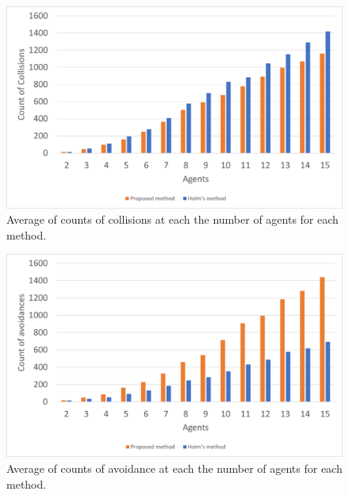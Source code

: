 \begin{figure}[H]\centering
	\includegraphics[width=1.0\textwidth]{Pictures/Average of count of collision of across all the number of user.png}%
	\caption{Average of counts of collisions at each the number of agents for each method.}\label{fig:Collision times average in all areas of our method}%
	
\end{figure}
\begin{figure}[H]\centering
	\includegraphics[width=1.0\textwidth]{Pictures/Average of count of collision avoidance of across all the number of user.png}%
	\caption{Average of counts of avoidance at each the number of agents for each method.}\label{fig:Avoidance times average in all areas of our method}%
	
\end{figure}




